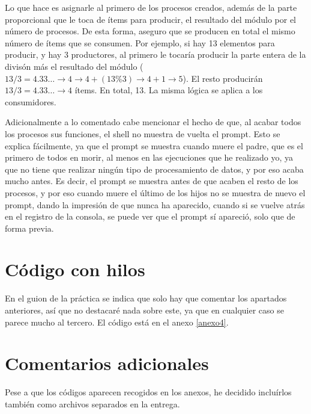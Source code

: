 \documentclass[a4paper]{article}
\begin{document}
Lo que hace es asignarle al primero de los procesos creados, además de la parte proporcional que le toca de ítems para producir, el resultado del módulo por el número de procesos. De esta forma, aseguro que se producen en total el mismo número de ítems que se consumen. Por ejemplo, si hay 13 elementos para producir, y hay 3 productores, al primero le tocaría producir la parte entera de la divisón más el resultado del módulo ($13/3=4.33\dots \rightarrow 4 \rightarrow 4 + (13 \% 3) \rightarrow 4 + 1 \rightarrow 5$). El resto producirán $13/3=4.33\dots \rightarrow 4$ ítems. En total, 13. La misma lógica se aplica a los consumidores.

Adicionalmente a lo comentado cabe mencionar el hecho de que, al acabar todos los procesos sus funciones, el shell no muestra de vuelta el prompt. Esto se explica fácilmente, ya que el prompt se muestra cuando muere el padre, que es el primero de todos en morir, al menos en las ejecuciones que he realizado yo, ya que no tiene que realizar ningún tipo de procesamiento de datos, y por eso acaba mucho antes. Es decir, el prompt se muestra antes de que acaben el resto de los procesos, y por eso cuando muere el último de los hijos no se muestra de nuevo el prompt, dando la impresión de que nunca ha aparecido, cuando si se vuelve atrás en el registro de la consola, se puede ver que el prompt sí apareció, solo que de forma previa.

\section{Código con hilos}

En el guion de la práctica se indica que solo hay que comentar los apartados anteriores, así que no destacaré nada sobre este, ya que en cualquier caso se parece mucho al tercero. El código está en el anexo \ref{anexo4}.

\section{Comentarios adicionales}

Pese a que los códigos aparecen recogidos en los anexos, he decidido incluírlos también como archivos separados en la entrega.
    
\end{document}
